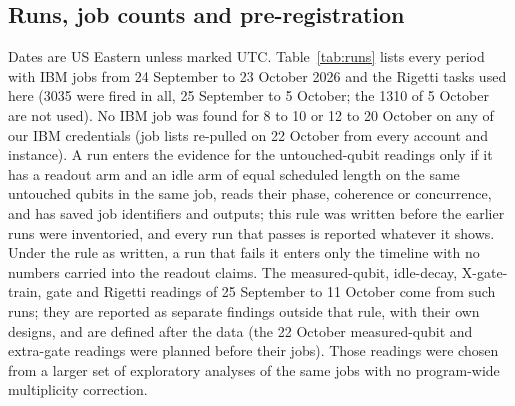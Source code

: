 \documentclass[reprint,amsmath,amssymb,aps,superscriptaddress,nofootinbib]{revtex4-2}
\begin{document}
\subsection{Runs, job counts and pre-registration}

Dates are US Eastern unless marked UTC. Table~\ref{tab:runs} lists every period with IBM jobs from 24 September to 23 October 2026 and the Rigetti tasks used here (3035 were fired in all, 25 September to 5 October; the 1310 of 5 October are not used). No IBM job was found for 8 to 10 or 12 to 20 October on any of our IBM credentials (job lists re-pulled on 22 October from every account and instance). A run enters the evidence for the untouched-qubit readings only if it has a readout arm and an idle arm of equal scheduled length on the same untouched qubits in the same job, reads their phase, coherence or concurrence, and has saved job identifiers and outputs; this rule was written before the earlier runs were inventoried, and every run that passes is reported whatever it shows. Under the rule as written, a run that fails it enters only the timeline with no numbers carried into the readout claims. The measured-qubit, idle-decay, X-gate-train, gate and Rigetti readings of 25 September to 11 October come from such runs; they are reported as separate findings outside that rule, with their own designs, and are defined after the data (the 22 October measured-qubit and extra-gate readings were planned before their jobs). Those readings were chosen from a larger set of exploratory analyses of the same jobs with no program-wide multiplicity correction.
\end{document}
